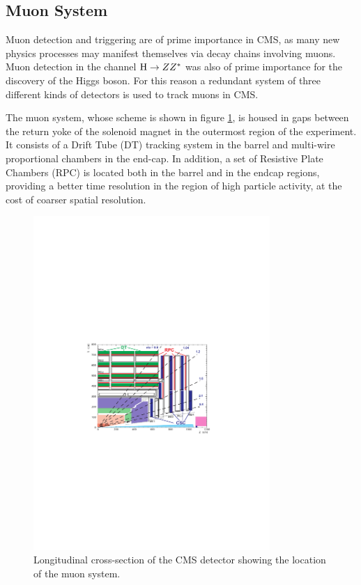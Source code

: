 \subsection{Muon System}

Muon detection and triggering are of prime importance in CMS, as many new physics processes may manifest themselves via decay chains involving muons. 
Muon detection in the channel $\mathrm{H}\rightarrow ZZ^\ast$ was also of prime importance for the discovery of the Higgs boson. %
For this reason a redundant system of three different kinds of detectors is used to track muons in CMS. 

The muon system, whose scheme is shown in figure \ref{fig:mudet}, is housed in gaps between the return yoke of the solenoid magnet in the outermost region of the experiment. It consists of a Drift Tube (DT) tracking system in the barrel and multi-wire proportional chambers in the end-cap. In addition, a set of Resistive Plate Chambers (RPC) is located both in the barrel and in the endcap regions, providing a better time resolution  in the region of high particle activity, at the cost of coarser spatial resolution. 

\begin{figure}
\begin{center}
\includegraphics[angle=-0,width=0.8\textwidth]{2_LHC_and_CMS/pics/mudet.pdf}
\caption{Longitudinal cross-section of the CMS detector showing the location of the muon system.
\label{fig:mudet}
}
\end{center}
\end{figure}

